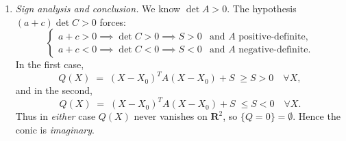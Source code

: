 \begin{enumerate}
  \item \emph{Sign analysis and conclusion.}  
    We know \(\det A>0\).  The hypothesis \((a+c)\det C>0\) forces:
    \[
      \begin{cases}
        a+c>0 \implies \det C>0 \implies S>0
        &\text{and }A\text{ positive‐definite},\\
        a+c<0 \implies \det C<0 \implies S<0
        &\text{and }A\text{ negative‐definite}.
      \end{cases}
    \]
    In the first case,
    \[
      Q(X) \;=\;(X-X_0)^T A (X-X_0) + S\;\ge S>0
      \quad\forall X,
    \]
    and in the second,
    \[
      Q(X) \;=\;(X-X_0)^T A (X-X_0) + S\;\le S<0
      \quad\forall X.
    \]
    Thus in \emph{either} case \(Q(X)\) never vanishes on \(\mathbf R^2\), so
    \(\{Q=0\} = \emptyset\).  Hence the conic is \emph{imaginary}. 
\end{enumerate}